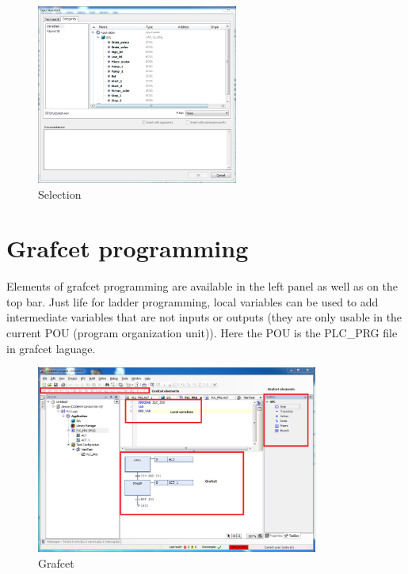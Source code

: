 \documentclass[10pt,a4paper]{article}
\begin{document}
\begin{figure}[h!]
	\begin{center}
		\includegraphics[width=250px]{img8.PNG}
	\end{center}
\caption{Selection}
\label{fig:sel}
\end{figure}

\section{Grafcet programming}

Elements of grafcet programming are available in the left panel as well as on the top bar.
Just life for ladder programming, local variables can be used to add intermediate variables that are not inputs or outputs (they are only usable in the current POU (program organization unit)). Here the POU is the PLC\_PRG file in grafcet laguage.

\begin{figure}[h!]
	\begin{center}
		\includegraphics[width=350px]{img13.PNG}
	\end{center}
\caption{Grafcet}
\label{fig:grafcet}
\end{figure}
\end{document}
